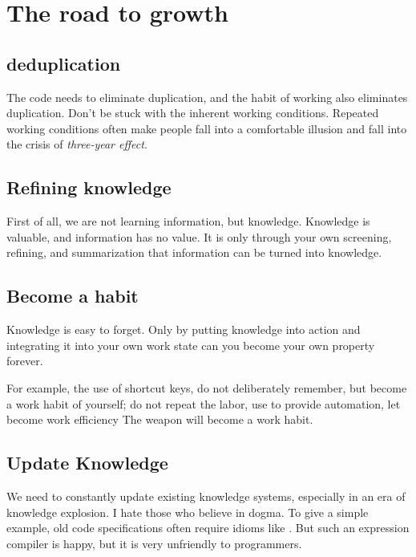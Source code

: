 \section{The road to growth}

\begin{content}

\subsection{deduplication}

The code needs to eliminate duplication, and the habit of working also eliminates duplication. Don't be stuck with the inherent working conditions. Repeated working conditions often make people fall into a comfortable illusion and fall into the crisis of \emph{three-year effect}.

\subsection{Refining knowledge}

First of all, we are not learning information, but knowledge. Knowledge is valuable, and information has no value. It is only through your own screening, refining, and summarization that information can be turned into knowledge.

\subsection{Become a habit}

Knowledge is easy to forget. Only by putting knowledge into action and integrating it into your own work state can you become your own property forever.

For example, the use of shortcut keys, do not deliberately remember, but become a work habit of yourself; do not repeat the labor, use  to provide automation, let  become work efficiency The weapon will become a work habit.

\subsection{Update Knowledge}

We need to constantly update existing knowledge systems, especially in an era of knowledge explosion. I hate those who believe in dogma. To give a simple example, old code specifications often require  idioms like . But such an expression compiler is happy, but it is very unfriendly to programmers.


\end{content}
